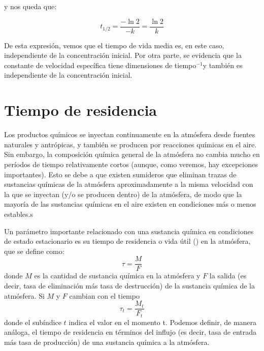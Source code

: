 y nos queda que:

$$t_{1/2}=\frac{-\ln2}{-k}=\frac{\ln2}{k}$$

De esta expresión, vemos que el tiempo de vida media es, en este caso, independiente de la concentración inicial. Por otra parte, se evidencia que la constante de velocidad específica tiene dimensiones de tiempo$^{-1}$y también es independiente de la concentración inicial.

\section{Tiempo de residencia}\label{tdres}
Los productos químicos se inyectan continuamente en la atmósfera desde fuentes naturales y antrópicas, y también se producen por reacciones químicas en el aire. Sin embargo, la composición química general de la atmósfera no cambia mucho en períodos de tiempo relativamente cortos (aunque, como veremos, hay excepciones importantes). Esto se debe a que existen sumideros que eliminan trazas de sustancias químicas de la atmósfera aproximadamente a la misma velocidad con la que se inyectan (y/o se producen dentro) de la atmósfera, de modo que la mayoría de las sustancias químicas en el aire existen en condiciones más o menos estables.s

Un parámetro importante relacionado con una sustancia química en condiciones de estado estacionario es su tiempo de residencia o vida útil () en la atmósfera, que se define como:
\begin{equation*}
\tau=\frac{M}{F}
\end{equation*}
donde $M$ es la cantidad de sustancia química en la atmósfera y $F$ la salida (es decir, tasa de eliminación más tasa de destrucción) de la sustancia química de la atmósfera. Si $M$ y $F$ cambian con el tiempo
\begin{equation*}
\tau_t=\frac{M_t}{F_t}
\end{equation*}
donde el subíndice $t$ indica el valor en el momento t. Podemos definir, de manera análoga, el tiempo de residencia en términos del influjo (es decir, tasa de entrada más tasa de producción) de una sustancia química a la atmósfera.

